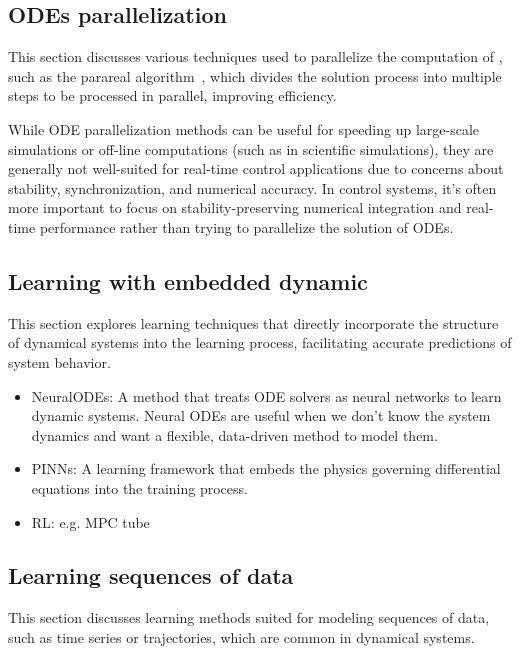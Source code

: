 \subsection{ODEs parallelization}

This section discusses various techniques used to parallelize the computation of , such as the parareal algorithm~\cite{cParareal}, which divides the solution process into multiple steps to be processed in parallel, improving efficiency.



While ODE parallelization methods can be useful for speeding up large-scale simulations or off-line computations (such as in scientific simulations), they are generally not well-suited for real-time control applications due to concerns about stability, synchronization, and numerical accuracy. In control systems, it's often more important to focus on stability-preserving numerical integration and real-time performance rather than trying to parallelize the solution of ODEs.


\subsection{Learning with embedded dynamic}

This section explores learning techniques that directly incorporate the structure of dynamical systems into the learning process, facilitating accurate predictions of system behavior.

\begin{itemize}
    \item NeuralODEs: A method that treats ODE solvers as neural networks to learn dynamic systems.
    Neural ODEs are useful when we don’t know the system dynamics and want a flexible, data-driven method to model them.
    \item PINNs: A learning framework that embeds the physics governing differential equations into the training process.
    \item RL: e.g. MPC tube 
\end{itemize}

\subsection{Learning sequences of data}

This section discusses learning methods suited for modeling sequences of data, such as time series or trajectories, which are common in dynamical systems.

